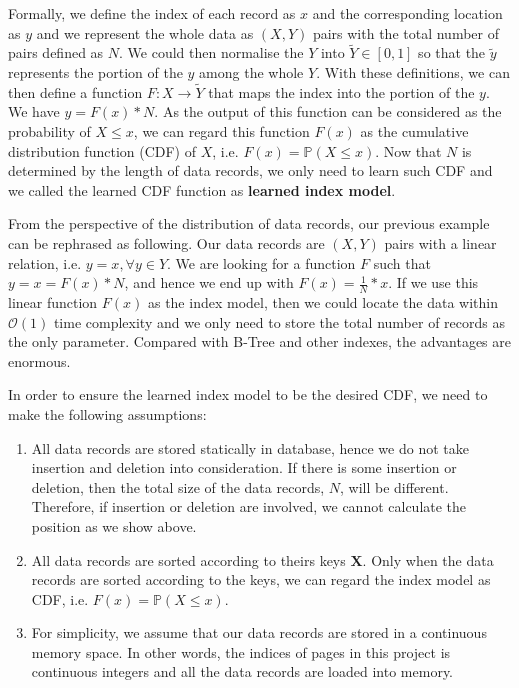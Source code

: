 
Formally, we define the index of each record as $x$ and the corresponding location as $y$ and we represent the whole data as $(X, Y)$ pairs with the total number of pairs defined as $N$. We could then normalise the $Y$ into $\tilde{Y}\in[0,1]$ so that the $\tilde{y}$ represents the portion of the $y$ among the whole $Y$. With these definitions, we can then define a function $F:X\to \tilde{Y}$ that maps the index into the portion of the $y$. We have $y=F(x)* N$. As the output of this function can be considered as the probability of $X\leq x$, we can regard this function $F(x)$ as the cumulative distribution function (CDF) of $X$, i.e. $F(x)=\mathbb{P}(X\leq x)$. Now that $N$ is determined by the length of data records, we only need to learn such CDF and we called the learned CDF function as \textbf{learned index model}.

\begin{mscexample}
	From the perspective of the distribution of data records, our previous example can be rephrased as following. Our data records are $(X, Y)$ pairs with a linear relation, i.e. $y=x, \forall y\in Y$. We are looking for a function $F$ such that $y=x=F(x)* N$, and hence we end up with $F(x)=\frac{1}{N}*x$. If we use this linear function $F(x)$ as the index model, then we could locate the data within $\mathcal{O}(1)$ time complexity and we only need to store the total number of records as the only parameter. Compared with B-Tree and other indexes, the advantages are enormous.
\end{mscexample}

In order to ensure the learned index model to be the desired CDF, we need to make the following assumptions:

\begin{enumerate}
	\item All data records are stored statically in database, hence we do not take insertion and deletion into consideration. If there is some insertion or deletion, then the total size of the data records, $N$, will be different. Therefore, if insertion or deletion are involved, we cannot calculate the position as we show above.
	\item All data records are sorted according to theirs keys $\boldsymbol{X}$. Only when the data records are sorted according to the keys, we can regard the index model as CDF, i.e. $F(x)=\mathbb{P}(X\leq x)$.
	\item For simplicity, we assume that our data records are stored in a continuous memory space. In other words, the indices of pages in this project is continuous integers and all the data records are loaded into memory.
\end{enumerate}